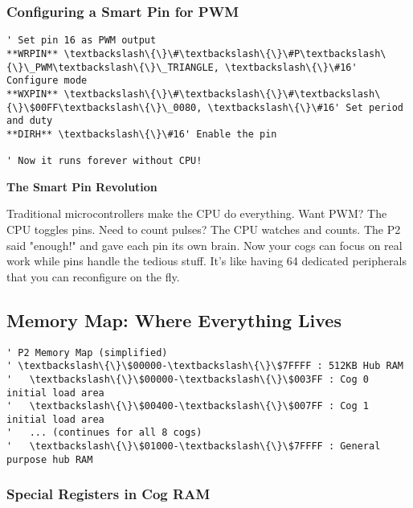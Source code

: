 \documentclass[11pt]{book}
\begin{document}
\hypertarget{configuring-a-smart-pin-for-pwm}{%
\subsubsection{Configuring a Smart Pin for
PWM}\label{configuring-a-smart-pin-for-pwm}}

\begin{lstlisting}
' Set pin 16 as PWM output
**WRPIN** \textbackslash\{\}\#\textbackslash\{\}\#P\textbackslash\{\}\_PWM\textbackslash\{\}\_TRIANGLE, \textbackslash\{\}\#16' Configure mode
**WXPIN** \textbackslash\{\}\#\textbackslash\{\}\#\textbackslash\{\}\$00FF\textbackslash\{\}\_0080, \textbackslash\{\}\#16' Set period and duty
**DIRH** \textbackslash\{\}\#16' Enable the pin
        
' Now it runs forever without CPU!
\end{lstlisting}

\begin{interlude}
\textbf{The Smart Pin Revolution}

Traditional microcontrollers make the CPU do everything. Want PWM? The CPU toggles pins. Need to count pulses? The CPU watches and counts. The P2 said "enough!" and gave each pin its own brain. Now your cogs can focus on real work while pins handle the tedious stuff. It's like having 64 dedicated peripherals that you can reconfigure on the fly.
\end{interlude}

\hypertarget{memory-map-where-everything-lives}{%
\subsection{Memory Map: Where Everything
Lives}\label{memory-map-where-everything-lives}}

\begin{lstlisting}
' P2 Memory Map (simplified)
' \textbackslash\{\}\$00000-\textbackslash\{\}\$7FFFF : 512KB Hub RAM
'   \textbackslash\{\}\$00000-\textbackslash\{\}\$003FF : Cog 0 initial load area
'   \textbackslash\{\}\$00400-\textbackslash\{\}\$007FF : Cog 1 initial load area
'   ... (continues for all 8 cogs)
'   \textbackslash\{\}\$01000-\textbackslash\{\}\$7FFFF : General purpose hub RAM
\end{lstlisting}

\hypertarget{special-registers-in-cog-ram}{%
\subsubsection{Special Registers in Cog
RAM}\label{special-registers-in-cog-ram}}
\end{document}
